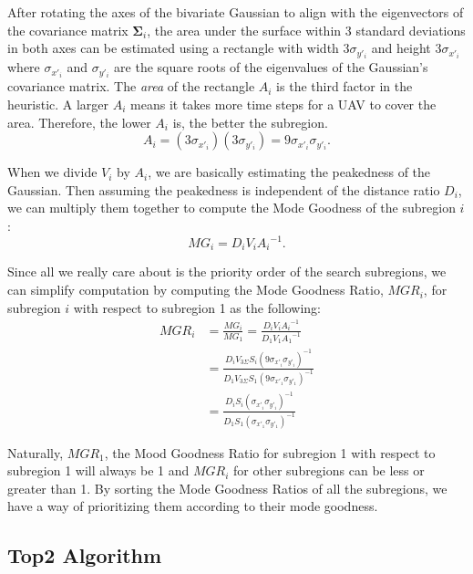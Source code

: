 After rotating the axes of the bivariate Gaussian to align with the eigenvectors of the covariance matrix $\mathbf{\Sigma}_i$, the area under the surface within 3 standard deviations in both axes can be estimated using a rectangle with width $3\sigma_{y'_i}$ and height $3\sigma_{x'_i}$ where $\sigma_{x'_i}$ and $\sigma_{y'_i}$ are the square roots of the eigenvalues of the Gaussian's covariance matrix. The \textit{area} of the rectangle $A_i$ is the third factor in the heuristic. A larger $A_i$ means it takes more time steps for a UAV to cover the area. Therefore, the lower $A_i$ is, the better the subregion.
\begin{equation}
A_i = (3\sigma_{x'_i})(3\sigma_{y'_i}) = 9\sigma_{x'_i}\sigma_{y'_i}.
\label{Area}
\end{equation}

When we divide $V_i$ by $A_i$, we are basically estimating the peakedness of the Gaussian. Then assuming the peakedness is independent of the distance ratio $D_i$, we can multiply them together to compute the Mode Goodness of the subregion $i$:
\begin{equation}
MG_i = D_i V_i {A_i}^{-1}.
\label{Goodness}
\end{equation}

Since all we really care about is the priority order of the search subregions, we can simplify computation by computing the Mode Goodness Ratio, $\mathit{MGR}_i$, for subregion $i$ with respect to subregion 1 as the following:
\begin{align}
\mathit{MGR}_i &= \frac{MG_i}{MG_1} = \frac{D_i V_i {A_i}^{-1}}{D_1 V_1 {A_1}^{-1}} \\
&= \frac{D_i V_{3\Sigma} S_i (9\sigma_{x'_i}\sigma_{y'_i})^{-1}}{D_1 V_{3\Sigma} S_1 (9\sigma_{x'_1}\sigma_{y'_1})^{-1}} \\
&= \frac{D_i S_i (\sigma_{x'_i}\sigma_{y'_i})^{-1}}{D_1 S_1 (\sigma_{x'_1}\sigma_{y'_1})^{-1}}
\label{GoodnessRatio}
\end{align}

Naturally, $\mathit{MGR}_1$, the Mood Goodness Ratio for subregion 1 with respect to subregion 1 will always be 1 and $\mathit{MGR}_i$ for other subregions can be less or greater than 1. By sorting the Mode Goodness Ratios of all the subregions, we have a way of prioritizing them according to their mode goodness.


\subsection{Top2 Algorithm}

